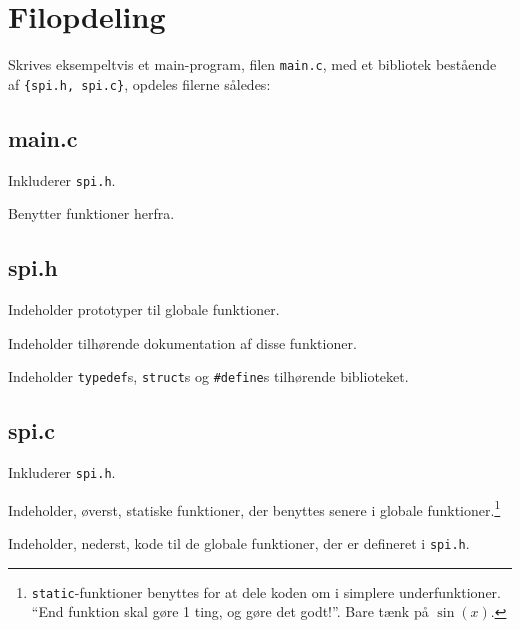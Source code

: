 \documentclass[article]{memoir}
\let\tempone\itemize
\let\temptwo\enditemize
\renewenvironment{itemize}{\tempone\firmlist}{\temptwo}
\begin{document}
\chapter{Filopdeling}
Skrives eksempeltvis et main-program, filen \texttt{main.c}, med et bibliotek bestående af \texttt{\{spi.h, spi.c\}}, opdeles filerne således:

\section{main.c}
\begin{itemize}
    \item Inkluderer \texttt{spi.h}.
    \item Benytter funktioner herfra.
\end{itemize}

\section{spi.h}
\begin{itemize}
    \item Indeholder prototyper til globale funktioner.
    \item Indeholder tilhørende dokumentation af disse funktioner.
    \item Indeholder \texttt{typedef}s, \texttt{struct}s og \texttt{\#define}s tilhørende biblioteket.
\end{itemize}

\section{spi.c}
\begin{itemize}
    \item Inkluderer \texttt{spi.h}.
    \item Indeholder, øverst, statiske funktioner, der benyttes senere i globale funktioner.\footnote{\texttt{static}-funktioner benyttes for at dele koden om i simplere underfunktioner. ``End funktion skal gøre 1 ting, og gøre det godt!''. Bare tænk på $\sin(x)$.}
    \item Indeholder, nederst, kode til de globale funktioner, der er defineret i \texttt{spi.h}.
\end{itemize}
\end{document}
